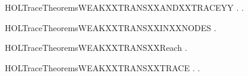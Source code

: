 \newcommand{\HOLTraceTheoremsWEAKXXTRANSXXANDXXTRACE}{\UseVerbatim{HOLTraceTheoremsWEAKXXTRANSXXANDXXTRACE}}
\begin{SaveVerbatim}{HOLTraceTheoremsWEAKXXTRANSXXANDXXTRACEYY}
\HOLTokenTurnstile{} \HOLSymConst{\HOLTokenForall{}}  .
        \HOLTokenWeakTransBegin{}\HOLTokenWeakTransEnd {} \HOLSymConst{\HOLTokenEquiv{}}
       \HOLSymConst{\HOLTokenExists{}}.
               \HOLSymConst{\HOLTokenConj{}} \HOLSymConst{\HOLTokenNeg{}}  \HOLSymConst{\HOLTokenConj{}}
             \HOLSymConst{=} \HOLConst{\ensuremath{\tau}}       
\end{SaveVerbatim}
\newcommand{\HOLTraceTheoremsWEAKXXTRANSXXANDXXTRACEYY}{\UseVerbatim{HOLTraceTheoremsWEAKXXTRANSXXANDXXTRACEYY}}
\begin{SaveVerbatim}{HOLTraceTheoremsWEAKXXTRANSXXINXXNODES}
\HOLTokenTurnstile{} \HOLSymConst{\HOLTokenForall{}}  .  \HOLTokenWeakTransBegin{}\HOLTokenWeakTransEnd {} \HOLSymConst{\HOLTokenImp{}}  \HOLConst{\HOLTokenIn{}}  
\end{SaveVerbatim}
\newcommand{\HOLTraceTheoremsWEAKXXTRANSXXINXXNODES}{\UseVerbatim{HOLTraceTheoremsWEAKXXTRANSXXINXXNODES}}
\begin{SaveVerbatim}{HOLTraceTheoremsWEAKXXTRANSXXReach}
\HOLTokenTurnstile{} \HOLSymConst{\HOLTokenForall{}}  .  \HOLTokenWeakTransBegin{}\HOLTokenWeakTransEnd {} \HOLSymConst{\HOLTokenImp{}}   
\end{SaveVerbatim}
\newcommand{\HOLTraceTheoremsWEAKXXTRANSXXReach}{\UseVerbatim{HOLTraceTheoremsWEAKXXTRANSXXReach}}
\begin{SaveVerbatim}{HOLTraceTheoremsWEAKXXTRANSXXTRACE}
\HOLTokenTurnstile{} \HOLSymConst{\HOLTokenForall{}}  .  \HOLTokenWeakTransBegin{}\HOLTokenWeakTransEnd {} \HOLSymConst{\HOLTokenImp{}} \HOLSymConst{\HOLTokenExists{}}.    
\end{SaveVerbatim}
